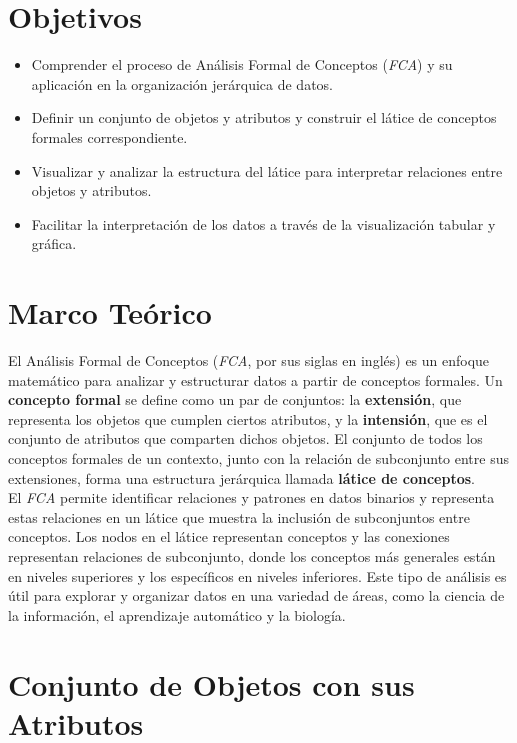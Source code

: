 \newcommand{\quotes}[1]{``#1''}

\section{Objetivos}
\begin{itemize}
    \item Comprender el proceso de Análisis Formal de Conceptos (\textit{FCA}) y su aplicación en la organización jerárquica de datos.
    \item Definir un conjunto de objetos y atributos y construir el látice de conceptos formales correspondiente.
    \item Visualizar y analizar la estructura del látice para interpretar relaciones entre objetos y atributos.
    \item Facilitar la interpretación de los datos a través de la visualización tabular y gráfica.
\end{itemize}

\section{Marco Teórico}

El Análisis Formal de Conceptos (\textit{FCA}, por sus siglas en inglés) es un enfoque matemático para analizar y estructurar datos a partir de conceptos formales. Un \textbf{concepto formal} se define como un par de conjuntos: la \textbf{extensión}, que representa los objetos que cumplen ciertos atributos, y la \textbf{intensión}, que es el conjunto de atributos que comparten dichos objetos. El conjunto de todos los conceptos formales de un contexto, junto con la relación de subconjunto entre sus extensiones, forma una estructura jerárquica llamada \textbf{látice de conceptos}.\\


El \textit{FCA} permite identificar relaciones y patrones en datos binarios y representa estas relaciones en un látice que muestra la inclusión de subconjuntos entre conceptos. Los nodos en el látice representan conceptos y las conexiones representan relaciones de subconjunto, donde los conceptos más generales están en niveles superiores y los específicos en niveles inferiores. Este tipo de análisis es útil para explorar y organizar datos en una variedad de áreas, como la ciencia de la información, el aprendizaje automático y la biología.

\section{Conjunto de Objetos con sus Atributos}

